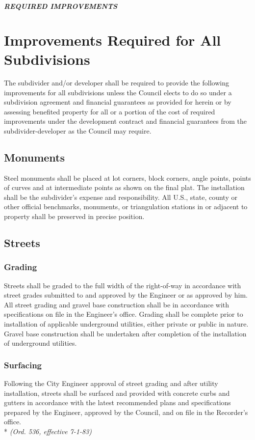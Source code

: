 \begin{center}
    \emph{\textbf{\LARGE{REQUIRED IMPROVEMENTS}}}
\end{center}

\setcounter{section}{49}
\section{Improvements Required for All Subdivisions}
The subdivider and/or developer shall be required to provide the following improvements for all subdivisions unless the Council elects to do so under a subdivision agreement and financial guarantees as provided for herein or by assessing benefited property for all or a portion of the cost of required improvements under the development contract and financial guarantees from the subdivider-developer as the Council may require.
\subsection{Monuments}
Steel monuments shall be placed at lot corners, block corners, angle points, points of curves and at intermediate points as shown on the final plat. The installation shall be the subdivider’s expense and responsibility. All U.S., state, county or other official benchmarks, monuments, or triangulation stations in or adjacent to property shall be preserved in precise position.
\subsection{Streets}
\subsubsection{Grading}
Streets shall be graded to the full width of the right-of-way in accordance with street grades submitted to and approved by the Engineer or as approved by him. All street grading and gravel base construction shall be in accordance with specifications on file in the Engineer’s office. Grading shall be complete prior to installation of applicable underground utilities, either private or public in nature. Gravel base construction shall be undertaken after completion of the installation of underground utilities.
\subsubsection{Surfacing}
Following the City Engineer approval of street grading and after utility installation, streets shall be surfaced and provided with concrete curbs and gutters in accordance with the latest recommended plans and specifications prepared by the Engineer, approved by the Council, and on file in the Recorder’s office.\\*
\emph{(Ord. 536, effective 7-1-83)}
